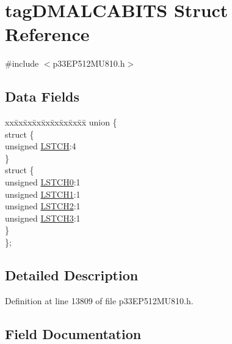 \hypertarget{structtag_d_m_a_l_c_a_b_i_t_s}{}\section{tag\+D\+M\+A\+L\+C\+A\+B\+I\+TS Struct Reference}
\label{structtag_d_m_a_l_c_a_b_i_t_s}


{\ttfamily \#include $<$p33\+E\+P512\+M\+U810.\+h$>$}

\subsection*{Data Fields}
\begin{DoxyCompactItemize}
\item 
\begin{tabbing}
xx\=xx\=xx\=xx\=xx\=xx\=xx\=xx\=xx\=\kill
union \{\\
\>struct \{\\
\>\>unsigned \hyperlink{structtag_d_m_a_l_c_a_b_i_t_s_a80e29da8bdabb07bfdaa2e2b94400e7d}{LSTCH}:4\\
\>\} \\
\>struct \{\\
\>\>unsigned \hyperlink{structtag_d_m_a_l_c_a_b_i_t_s_a99133dd929285aa30aed72db69d94348}{LSTCH0}:1\\
\>\>unsigned \hyperlink{structtag_d_m_a_l_c_a_b_i_t_s_a625fc7c337afa6d6c6856fb5efbe17c4}{LSTCH1}:1\\
\>\>unsigned \hyperlink{structtag_d_m_a_l_c_a_b_i_t_s_a4471a7966c29446aae6a60149c398485}{LSTCH2}:1\\
\>\>unsigned \hyperlink{structtag_d_m_a_l_c_a_b_i_t_s_a650afeb9fbb8556dd9328f31fe765604}{LSTCH3}:1\\
\>\} \\
\}; \\

\end{tabbing}\end{DoxyCompactItemize}


\subsection{Detailed Description}


Definition at line 13809 of file p33\+E\+P512\+M\+U810.\+h.



\subsection{Field Documentation}
\mbox{\label{structtag_d_m_a_l_c_a_b_i_t_s_ac469cd076d16de5ce417759865064246}} 
